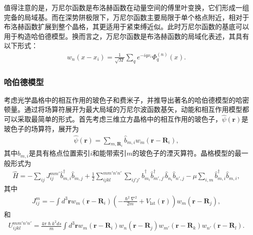 值得注意的是，万尼尔函数是布洛赫函数在动量空间的傅里叶变换，它们形成一组完备的局域基\cite{abramowitz1964handbook}。而在深势阱极限下，万尼尔函数主要局限于单个格点附近，相对于布洛赫函数扩展到整个晶格，其更适用于紧束缚近似。此时万尼尔函数的基底可以用于构造哈伯德模型。换而言之，万尼尔函数是布洛赫函数的局域化表述，其具有以下形式：
\begin{align}
w_n(x - x_i) = \frac{1}{\sqrt{M}} \sum_q e^{-iqx_i} \Phi_q^{(n)}(x). \label{eq:3.15}
\end{align}

\subsubsection{哈伯德模型}

考虑光学晶格中的相互作用的玻色子和费米子，并推导出著名的哈伯德模型\cite{zhai2021ultracold}的哈密顿量。通过将场算符展开为最大局域的万尼尔波函数基矢，动能和相互作用模型都可以采取最简单的形式。首先考虑三维立方晶格中的相互作用的玻色子，$\hat{\psi}(\mathbf{r})$是玻色子的场算符，展开为
\begin{align}
\hat{\psi}(\mathbf{r}) = \sum_{m, \mathbf{R}_i} \hat{b}_{m,i} w_m(\mathbf{r} - \mathbf{R}_i),
\end{align}
其中$\hat{b}_{m,i}$是具有格点位置索引$i$和能带索引$m$的玻色子的湮灭算符。晶格模型的最一般形式为
\begin{align}
\hat{H} = - \sum_{ij} J_{ij}^{mm'} \hat{b}_{m,i}^\dagger \hat{b}_{m,j} + \frac{1}{2} \sum_{ijkl}^{mm'n'n'} \sum_{ij'j'} \hat{b}_{m_i}^\dagger \hat{b}_{m',j'}^\dagger \hat{b}_{n_i} \hat{b}_{n',j} - \mu \sum_{i,m} \hat{b}_{m,i}^\dagger \hat{b}_{m,i},
\end{align}
其中
\begin{align}
J_{ij}^{m} = - \int d^3 \mathbf{r} w_m(\mathbf{r} - \mathbf{R}_i) \left( - \frac{\hslash^2 {\nabla}^2}{2m} + V_{\text{lat}}(\mathbf{r}) \right) w_m(\mathbf{r} - \mathbf{R}_j),
\end{align}
和
\begin{align}
U_{ijkl}^{mm'n'n'} = \frac{4 \pi \hslash{k}^2 ds}{m} \int d^3 \mathbf{r} w_m(\mathbf{r} - \mathbf{R}_i) w_n(\mathbf{r} - \mathbf{R}_j) w_{m'}(\mathbf{r} - \mathbf{R}_k) w_{n'}(\mathbf{r} - \mathbf{R}_l).
\end{align}
